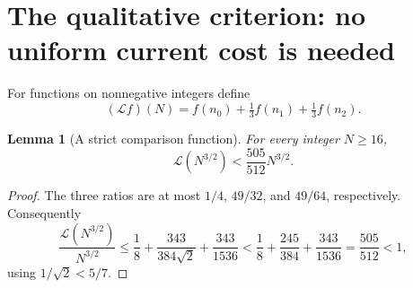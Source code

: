 \documentclass[11pt]{article}
\newtheorem{lemma}[theorem]{Lemma}
\newcommand{\Lip}{\mathcal L}
\begin{document}
\section{The qualitative criterion: no uniform current cost is needed}
For functions on nonnegative integers define
\[
(\Lip f)(N)=f(n_0)+\tfrac13f(n_1)+\tfrac13f(n_2).
\]
\begin{lemma}[A strict comparison function]
For every integer $N\ge16$,
\[
\Lip(N^{3/2})<\frac{505}{512}N^{3/2}.                         \tag{4}
\]
\end{lemma}
\begin{proof}
The three ratios are at most $1/4$, $49/32$, and $49/64$, respectively.
Consequently
\[
\frac{\Lip(N^{3/2})}{N^{3/2}}
\le\frac18+\frac{343}{384\sqrt2}+\frac{343}{1536}
<\frac18+\frac{245}{384}+\frac{343}{1536}
=\frac{505}{512}<1,
\]
using $1/\sqrt2<5/7$.
\end{proof}
\end{document}
